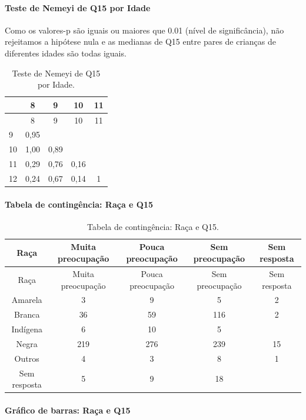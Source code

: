 \documentclass[]{article}
\let\oldparagraph\paragraph
\renewcommand{\paragraph}[1]{\oldparagraph{#1}\mbox{}}
\begin{document}
\hypertarget{teste-de-nemeyi-de-q15-por-idade}{%
\paragraph{Teste de Nemeyi de Q15 por Idade}\label{teste-de-nemeyi-de-q15-por-idade}}

Como os valores-p são iguais ou maiores que 0.01 (nível de significância), não rejeitamos a hipótese nula e as medianas de Q15 entre pares de crianças de diferentes idades são todas iguais.

\begin{longtable}[]{@{}lcccc@{}}
\caption{\label{tab:unnamed-chunk-101}Teste de Nemeyi de Q15 por Idade.}\tabularnewline
\toprule
& 8 & 9 & 10 & 11\tabularnewline
\midrule
\endfirsthead
\toprule
& 8 & 9 & 10 & 11\tabularnewline
\midrule
\endhead
9 & 0,95 & & &\tabularnewline
10 & 1,00 & 0,89 & &\tabularnewline
11 & 0,29 & 0,76 & 0,16 &\tabularnewline
12 & 0,24 & 0,67 & 0,14 & 1\tabularnewline
\bottomrule
\end{longtable}

\cleardoublepage

\hypertarget{tabela-de-continguxeancia-rauxe7a-e-q15}{%
\paragraph{Tabela de contingência: Raça e Q15}\label{tabela-de-continguxeancia-rauxe7a-e-q15}}

\begin{longtable}[]{@{}ccccc@{}}
\caption{\label{tab:unnamed-chunk-102}Tabela de contingência: Raça e Q15.}\tabularnewline
\toprule
Raça & Muita preocupação & Pouca preocupação & Sem preocupação & Sem resposta\tabularnewline
\midrule
\endfirsthead
\toprule
Raça & Muita preocupação & Pouca preocupação & Sem preocupação & Sem resposta\tabularnewline
\midrule
\endhead
Amarela & 3 & 9 & 5 & 2\tabularnewline
Branca & 36 & 59 & 116 & 2\tabularnewline
Indígena & 6 & 10 & 5 &\tabularnewline
Negra & 219 & 276 & 239 & 15\tabularnewline
Outros & 4 & 3 & 8 & 1\tabularnewline
Sem resposta & 5 & 9 & 18 &\tabularnewline
\bottomrule
\end{longtable}

\hypertarget{gruxe1fico-de-barras-rauxe7a-e-q15}{%
\paragraph{Gráfico de barras: Raça e Q15}\label{gruxe1fico-de-barras-rauxe7a-e-q15}}
\end{document}
